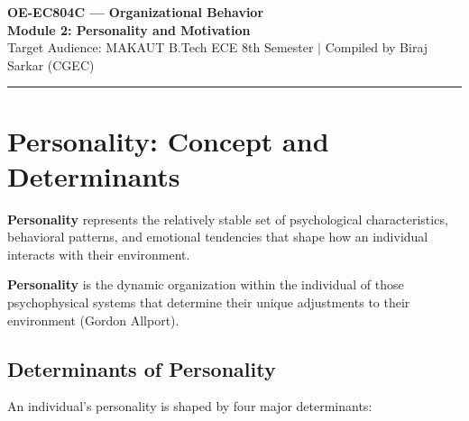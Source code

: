 \documentclass[11pt,a4paper]{article}
\begin{document}
\begin{center}
  {\LARGE \bfseries \color{myred} OE-EC804C --- Organizational Behavior}\\[6pt]
  {\Large \bfseries \color{myteal} Module 2: Personality and Motivation}\\[4pt]
  {\small \color{mydark} Target Audience: MAKAUT B.Tech ECE 8th Semester $|$ Compiled by Biraj Sarkar (CGEC)}
\end{center}
\vspace{-6pt}
\hrule
\vspace{10pt}

\begin{tcolorbox}[tikzbox, title={Module Contents}]
\small
\tableofcontents
\end{tcolorbox}
\vspace{10pt}

\section{Personality: Concept and Determinants}

\textbf{Personality} represents the relatively stable set of psychological characteristics, behavioral patterns, and emotional tendencies that shape how an individual interacts with their environment.

\begin{tcolorbox}[defbox, title={Definition of Personality}]
  \textbf{Personality} is the dynamic organization within the individual of those psychophysical systems that determine their unique adjustments to their environment (Gordon Allport).
\end{tcolorbox}

\subsection{Determinants of Personality}
An individual's personality is shaped by four major determinants:
\end{document}
